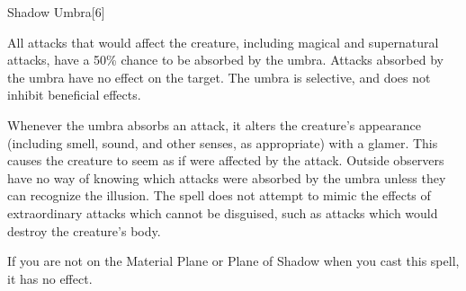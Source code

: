 \begin{spellsection}{Shadow Umbra}[6]
    \begin{spellheader}
    \end{spellheader}
    \begin{spellcontent}
        \begin{spelltargetinginfo}
        \end{spelltargetinginfo}
        \begin{spelleffects}
            \spelleffect All attacks that would affect the creature, including magical and supernatural attacks, have a 50\% chance to be absorbed by the umbra. Attacks absorbed by the umbra have no effect on the target. The umbra is selective, and does not inhibit beneficial effects.

            Whenever the umbra absorbs an attack, it alters the creature's appearance (including smell, sound, and other senses, as appropriate) with a glamer. This causes the creature to seem as if were affected by the attack. Outside observers have no way of knowing which attacks were absorbed by the umbra unless they can recognize the illusion. The spell does not attempt to mimic the effects of extraordinary attacks which cannot be disguised, such as attacks which would destroy the creature's body.
            \spelldur \durshort
        \end{spelleffects}
    \end{spellcontent}
    \begin{spellfooter}
        \spellnotes If you are not on the Material Plane or Plane of Shadow when you cast this spell, it has no effect.
        \miscastrandom
    \end{spellfooter}
\end{spellsection}

